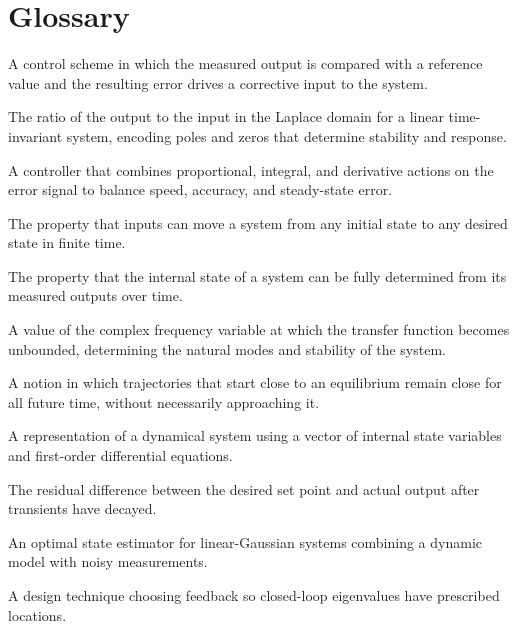 \section*{Glossary}
\begin{description}[leftmargin=*,style=nextline,itemsep=0.3em]
\item[\textbf{Feedback.}] A control scheme in which the measured output is compared with a reference value and the resulting error drives a corrective input to the system.
\item[\textbf{Transfer function.}] The ratio of the output to the input in the Laplace domain for a linear time-invariant system, encoding poles and zeros that determine stability and response.
\item[\textbf{PID controller.}] A controller that combines proportional, integral, and derivative actions on the error signal to balance speed, accuracy, and steady-state error.
\item[\textbf{Controllability.}] The property that inputs can move a system from any initial state to any desired state in finite time.
\item[\textbf{Observability.}] The property that the internal state of a system can be fully determined from its measured outputs over time.
\item[\textbf{Pole.}] A value of the complex frequency variable at which the transfer function becomes unbounded, determining the natural modes and stability of the system.
\item[\textbf{Lyapunov stability.}] A notion in which trajectories that start close to an equilibrium remain close for all future time, without necessarily approaching it.
\item[\textbf{State-space model.}] A representation of a dynamical system using a vector of internal state variables and first-order differential equations.
\item[\textbf{Steady-state error.}] The residual difference between the desired set point and actual output after transients have decayed.
\item[\textbf{Kalman filter.}] An optimal state estimator for linear-Gaussian systems combining a dynamic model with noisy measurements.
\item[\textbf{Pole placement.}] A design technique choosing feedback so closed-loop eigenvalues have prescribed locations.
\end{description}


